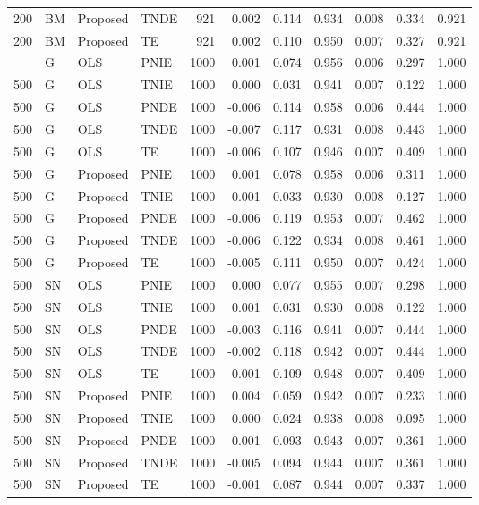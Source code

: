 \begin{longtable}{rlllrrrrrrr}
200 & BM & Proposed & TNDE & 921 & 0.002 & 0.114 & 0.934 & 0.008 & 0.334 & 0.921 \\
200 & BM & Proposed & TE & 921 & 0.002 & 0.110 & 0.950 & 0.007 & 0.327 & 0.921 \\
\pagebreak
500 & G & OLS & PNIE & 1000 & 0.001 & 0.074 & 0.956 & 0.006 & 0.297 & 1.000 \\
500 & G & OLS & TNIE & 1000 & 0.000 & 0.031 & 0.941 & 0.007 & 0.122 & 1.000 \\
500 & G & OLS & PNDE & 1000 & -0.006 & 0.114 & 0.958 & 0.006 & 0.444 & 1.000 \\
500 & G & OLS & TNDE & 1000 & -0.007 & 0.117 & 0.931 & 0.008 & 0.443 & 1.000 \\
500 & G & OLS & TE & 1000 & -0.006 & 0.107 & 0.946 & 0.007 & 0.409 & 1.000 \\
500 & G & Proposed & PNIE & 1000 & 0.001 & 0.078 & 0.958 & 0.006 & 0.311 & 1.000 \\
500 & G & Proposed & TNIE & 1000 & 0.001 & 0.033 & 0.930 & 0.008 & 0.127 & 1.000 \\
500 & G & Proposed & PNDE & 1000 & -0.006 & 0.119 & 0.953 & 0.007 & 0.462 & 1.000 \\
500 & G & Proposed & TNDE & 1000 & -0.006 & 0.122 & 0.934 & 0.008 & 0.461 & 1.000 \\
500 & G & Proposed & TE & 1000 & -0.005 & 0.111 & 0.950 & 0.007 & 0.424 & 1.000 \\
500 & SN & OLS & PNIE & 1000 & 0.000 & 0.077 & 0.955 & 0.007 & 0.298 & 1.000 \\
500 & SN & OLS & TNIE & 1000 & 0.001 & 0.031 & 0.930 & 0.008 & 0.122 & 1.000 \\
500 & SN & OLS & PNDE & 1000 & -0.003 & 0.116 & 0.941 & 0.007 & 0.444 & 1.000 \\
500 & SN & OLS & TNDE & 1000 & -0.002 & 0.118 & 0.942 & 0.007 & 0.444 & 1.000 \\
500 & SN & OLS & TE & 1000 & -0.001 & 0.109 & 0.948 & 0.007 & 0.409 & 1.000 \\
500 & SN & Proposed & PNIE & 1000 & 0.004 & 0.059 & 0.942 & 0.007 & 0.233 & 1.000 \\
500 & SN & Proposed & TNIE & 1000 & 0.000 & 0.024 & 0.938 & 0.008 & 0.095 & 1.000 \\
500 & SN & Proposed & PNDE & 1000 & -0.001 & 0.093 & 0.943 & 0.007 & 0.361 & 1.000 \\
500 & SN & Proposed & TNDE & 1000 & -0.005 & 0.094 & 0.944 & 0.007 & 0.361 & 1.000 \\
500 & SN & Proposed & TE & 1000 & -0.001 & 0.087 & 0.944 & 0.007 & 0.337 & 1.000 \\

\end{longtable}
